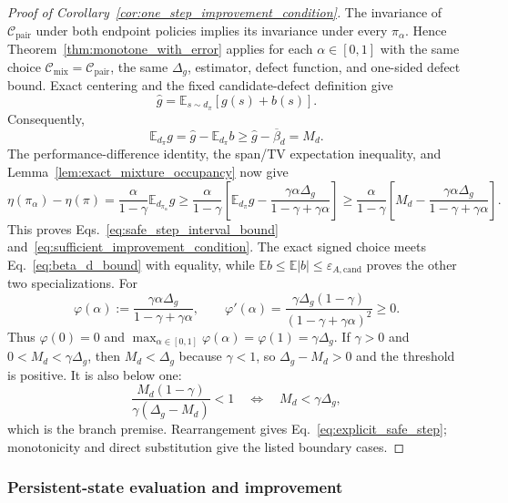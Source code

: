 \documentclass{article}
\theoremstyle{plain}
\theoremstyle{definition}
\theoremstyle{remark}
\newcommand{\E}{\mathbb{E}}
\begin{document}
\begin{proof}[Proof of Corollary~\ref{cor:one_step_improvement_condition}]
The invariance of $\mathcal C_{\mathrm{pair}}$ under both endpoint policies
implies its invariance under every $\pi_\alpha$. Hence
Theorem~\ref{thm:monotone_with_error} applies for each
$\alpha\in[0,1]$ with the same choice
$\mathcal C_{\mathrm{mix}}=\mathcal C_{\mathrm{pair}}$, the same
$\Delta_g$, estimator, defect function, and one-sided defect bound.
Exact centering and the fixed candidate-defect definition give
\begin{equation}
\widehat g
=\E_{s\sim d_\pi}[g(s)+b(s)].
\label{eq:ghat_signed_decomposition}
\end{equation}
Consequently,
\begin{equation}
\E_{d_\pi}g
=\widehat g-\E_{d_\pi}b
\ge \widehat g-\overline{\beta}_d
=M_d.
\label{eq:g_current_lower_bound}
\end{equation}
The performance-difference identity, the span/TV expectation inequality,
and Lemma~\ref{lem:exact_mixture_occupancy} now give
\[
\eta(\pi_\alpha)-\eta(\pi)
=\frac{\alpha}{1-\gamma}\E_{d_{\pi_\alpha}}g
\ge\frac{\alpha}{1-\gamma}
\left[
\E_{d_\pi}g
-\frac{\gamma\alpha\Delta_g}{1-\gamma+\gamma\alpha}
\right]
\ge\frac{\alpha}{1-\gamma}
\left[M_d-\frac{\gamma\alpha\Delta_g}
{1-\gamma+\gamma\alpha}\right].
\]
This proves Eqs.~\eqref{eq:safe_step_interval_bound}
and~\eqref{eq:sufficient_improvement_condition}. The exact signed choice
meets Eq.~\eqref{eq:beta_d_bound} with equality, while
$\E b\le\E|b|\le\varepsilon_{A,\mathrm{cand}}$ proves the other two
specializations. For
\[
\varphi(\alpha)
:=\frac{\gamma\alpha\Delta_g}{1-\gamma+\gamma\alpha},
\qquad
\varphi'(\alpha)
=\frac{\gamma\Delta_g(1-\gamma)}
{(1-\gamma+\gamma\alpha)^2}\ge0.
\]
Thus $\varphi(0)=0$ and
$\max_{\alpha\in[0,1]}\varphi(\alpha)=\varphi(1)=\gamma\Delta_g$.
If $\gamma>0$ and $0<M_d<\gamma\Delta_g$, then
$M_d<\Delta_g$ because $\gamma<1$, so $\Delta_g-M_d>0$ and the threshold is
positive. It is also below one:
\[
\frac{M_d(1-\gamma)}{\gamma(\Delta_g-M_d)}<1
\quad\Longleftrightarrow\quad
M_d<\gamma\Delta_g,
\]
which is the branch premise. Rearrangement gives
Eq.~\eqref{eq:explicit_safe_step}; monotonicity and direct substitution give
the listed boundary cases.
\end{proof}

\subsubsection{Persistent-state evaluation and improvement}
\label{app:proof_persistent}
\end{document}
